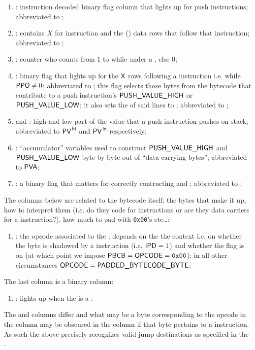 \begin{enumerate}[resume]
    \item \IP{}: instruction decoded binary flag column that lights up for push instructions; abbreviated to \ip{};
    \item \PP{}: contains $X$ for  instruction and the () data rows that follow that instruction; abbreviated to \pp{};
    \item \CP{}: counter who counts from 1 to \PP{} while under a , else 0;
    \item \IPD{}: binary flag that lights up for the $\textsf{X}$ rows following a  instruction i.e. while $\textsf{PPO}{} \neq 0$; abbreviated to \ipd{}; this flag selects those bytes from the bytecode that contribute to a push instruction's $\textsf{PUSH\_VALUE}\textsf{\_HIGH}$ or $\textsf{PUSH\_VALUE}\textsf{\_LOW}$; it also sets the \opc{} of said lines to ; abbreviated to \ipd{};
    \item \PV\HIGH{} and \PV\LOW{}: high and low part of the value that a push instruction pushes on stack; abbreviated to $\textsf{PV}^{\mathsf{\,hi}}$ and $\textsf{PV}^{\mathsf{\,lo}}$ respectively;
    \item \PVA: ``accumulator'' variables used to construct $\textsf{PUSH\_VALUE}\textsf{\_HIGH}$ and $\textsf{PUSH\_VALUE}\textsf{\_LOW}$ byte by byte out of ``data carrying bytes''; abbreviated to $\textsf{PVA}$;
    \item \PFB{}: a binary flag that matters for correctly contructing \PV\HIGH{} and \PV\LOW{}; abbreviated to \pfb{};
\end{enumerate}

The columns below are related to the bytecode itself: the bytes that make it up, how to interpret them (i.e. do they code for instructions or are they data carriers for a  instruction?), how much to pad with \texttt{0x00}'s etc\dots:
\begin{enumerate}[resume]
    \item \opc{}: the opcode associated to the \pbcb{}; depends on the the context i.e. on whether the byte is shadowed by a  instruction (i.e. \( \textsf{IPD}{}=1 \)) and whether the \CSR{} flag is on (at which point we impose $\textsf{PBCB}=\textsf{OPCODE}=\texttt{0x00}$); in all other circumstances \( \textsf{OPCODE}{} = \textsf{PADDED\_BYTECODE\_BYTE}{} \);
\end{enumerate}

The last column is a binary column:
\begin{enumerate}[resume]
    \item \ISVALIDJUMPDESTINATION{}: lights up when the \opc{} is a ;
\end{enumerate}
\saNote{} The \opc{} and \pbcb{} columns differ and what may be a byte corresponding to the  opcode in the \pbcb{} column may be obscured in the \opc{} column if that byte pertains to a  instruction. As such the above precisely recognizes valid jump destinations as specified in the .
